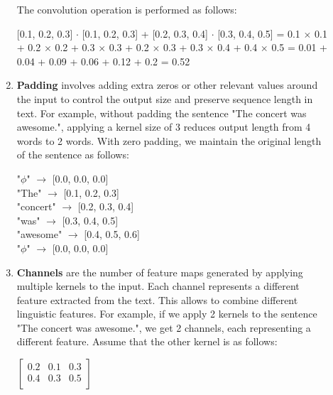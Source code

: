 \documentclass[10pt]{article}
\begin{document}
\begin{description}
\begin{enumerate}
        The convolution operation is performed as follows:

        \begin{center}
            [0.1, 0.2, 0.3] $\cdot$ [0.1, 0.2, 0.3] + [0.2, 0.3, 0.4] $\cdot$ [0.3, 0.4, 0.5] = 0.1 $\times$ 0.1 + 0.2 $\times$ 0.2 + 0.3 $\times$ 0.3 + 0.2 $\times$ 0.3 + 0.3 $\times$ 0.4 + 0.4 $\times$ 0.5 = 0.01 + 0.04 + 0.09 + 0.06 + 0.12 + 0.2 = 0.52
        \end{center}

        \item \textbf{Padding} involves adding extra zeros or other relevant values around the input to control the output size and preserve sequence length in text.
        For example, without padding the sentence "The concert was awesome.", applying a kernel size of 3 reduces output length from 4 words to 2 words.
        With zero padding, we maintain the original length of the sentence as follows:

        \begin{center}
            "$\phi$" $\rightarrow$ [0.0, 0.0, 0.0] \\
            "The" $\rightarrow$ [0.1, 0.2, 0.3] \\
            "concert" $\rightarrow$ [0.2, 0.3, 0.4] \\
            "was" $\rightarrow$ [0.3, 0.4, 0.5] \\
            "awesome" $\rightarrow$ [0.4, 0.5, 0.6] \\
            "$\phi$" $\rightarrow$ [0.0, 0.0, 0.0] \\
        \end{center}

        \item \textbf{Channels} are the number of feature maps generated by applying multiple kernels to the input. 
        Each channel represents a different feature extracted from the text. This allows to combine different linguistic features.
        For example, if we apply 2 kernels to the sentence "The concert was awesome.", we get 2 channels, each representing a different feature.
        Assume that the other kernel is as follows:

        \begin{center}
            $\displaystyle{\begin{bmatrix} 0.2 & 0.1 & 0.3 \\  0.4 & 0.3 & 0.5 \\ \end{bmatrix}}$
        \end{center}


\end{enumerate}
\end{description}
\end{document}
